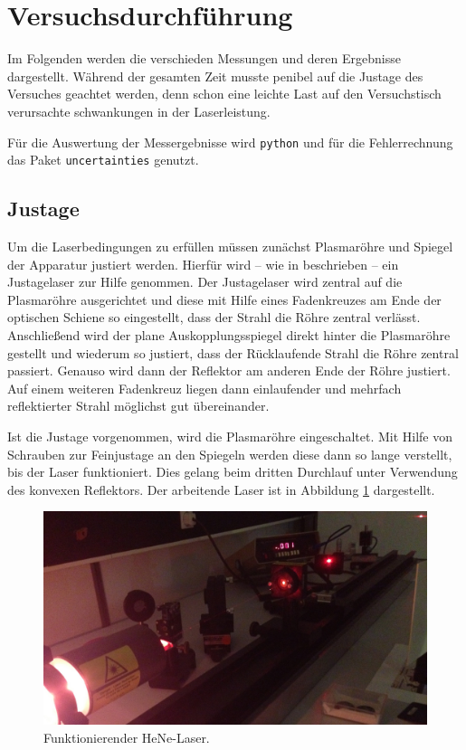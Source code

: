 \section{Versuchsdurchführung}
\label{sec:durchführung}
Im Folgenden werden die verschieden Messungen und deren Ergebnisse
dargestellt.
Während der gesamten Zeit musste penibel auf die Justage des Versuches
geachtet werden, denn schon eine leichte Last auf den Versuchstisch
verursachte schwankungen in der Laserleistung.

Für die Auswertung der Messergebnisse wird \texttt{python} und für die
Fehlerrechnung das Paket \texttt{uncertainties} genutzt.

\subsection{Justage}
\label{subsec:justage}
Um die Laserbedingungen zu erfüllen müssen zunächst Plasmaröhre und Spiegel der Apparatur justiert werden.
Hierfür wird -- wie in \cite{V61} beschrieben -- ein Justagelaser zur Hilfe genommen.
Der Justagelaser wird zentral auf die Plasmaröhre ausgerichtet und diese mit Hilfe eines Fadenkreuzes am Ende der optischen Schiene so eingestellt, dass der Strahl die Röhre zentral verlässt.
Anschließend wird der plane Auskopplungsspiegel direkt hinter die Plasmaröhre gestellt und wiederum so justiert, dass der Rücklaufende Strahl die Röhre zentral passiert.
Genauso wird dann der Reflektor am anderen Ende der Röhre justiert. Auf einem weiteren Fadenkreuz liegen dann einlaufender und mehrfach reflektierter Strahl möglichst gut übereinander.

Ist die Justage vorgenommen, wird die Plasmaröhre eingeschaltet.
Mit Hilfe von Schrauben zur Feinjustage an den Spiegeln werden diese dann so lange verstellt, bis der Laser funktioniert.
Dies gelang beim dritten Durchlauf unter Verwendung des konvexen Reflektors. Der arbeitende Laser ist in Abbildung \ref{fig:laser} dargestellt.
\begin{figure}
    \centering
    \includegraphics[width=0.9\linewidth]{img/laser.jpg}
    \caption{Funktionierender HeNe-Laser.}
    \label{fig:laser}
\end{figure}

